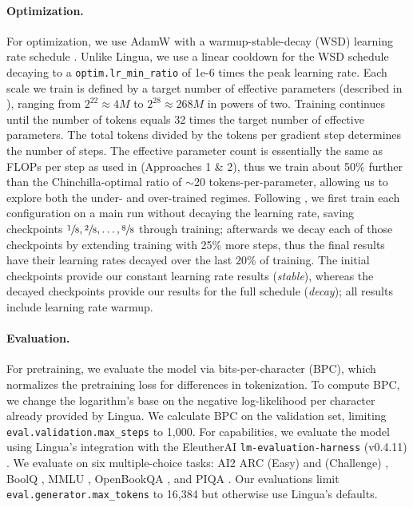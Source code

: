\paragraph{Optimization.} For optimization, we use AdamW \citep{loshchilov2018decoupled} with a warmup-stable-decay (WSD) learning rate schedule \citep{hu2024minicpm}. Unlike Lingua, we use a linear cooldown for the WSD schedule decaying to a \texttt{optim.lr\_min\_ratio} of 1e{-}6 times the peak learning rate. Each scale we train is defined by a target number of effective parameters (described in ), ranging from $2^{22} \approx 4M$ to $2^{28} \approx 268M$ in powers of two. Training continues until the number of tokens equals 32 times the target number of effective parameters. The total tokens divided by the tokens per gradient step determines the number of steps. The effective parameter count is essentially the same as FLOPs per step as used in \citet{Hoffmann2022AnEmpirical} (Approaches 1 \& 2), thus we train about 50\% further than the Chinchilla-optimal ratio of $\sim$20 tokens-per-parameter, allowing us to explore both the under- and over-trained regimes. Following \citet{Hagele2024ScalingLaws}, we first train each configuration on a main run without decaying the learning rate, saving checkpoints $\sfrac{1}{8}, \sfrac{2}{8}, \ldots, \sfrac{8}{8}$ through training; afterwards we decay each of those checkpoints by extending training with 25\% more steps, thus the final results have their learning rates decayed over the last 20\% of training. The initial checkpoints provide our constant learning rate results (\emph{stable}), whereas the decayed checkpoints provide our results for the full schedule (\emph{decay}); all results include learning rate warmup.

\paragraph{Evaluation.} For pretraining, we evaluate the model via bits-per-character (BPC), which normalizes the pretraining loss for differences in tokenization. To compute BPC, we change the logarithm's base on the negative log-likelihood per character already provided by Lingua. We calculate BPC on the validation set, limiting \texttt{eval.validation.max\_steps} to 1{,}000. For capabilities, we evaluate the model using Lingua's integration with the EleutherAI \texttt{lm-evaluation-harness} (v0.4.11) \citep{eval-harness}. We evaluate on six multiple-choice tasks: AI2 ARC (Easy) and (Challenge) \citep{clark2018thinksolvedquestionanswering}, BoolQ \citep{clark-etal-2019-boolq}, MMLU \citep{hendrycks2021measuring}, OpenBookQA \citep{mihaylov-etal-2018-suit}, and PIQA \citep{Bisk2020PIQA}. Our evaluations limit \texttt{eval.generator.max\_tokens} to 16{,}384 but otherwise use Lingua's defaults.

